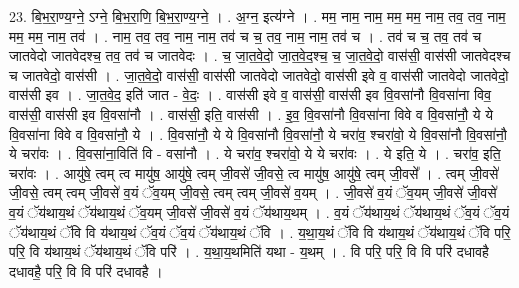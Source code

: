 \documentclass[17pt]{extarticle}
\begin{document}
23. बि॒भ॒रा॒ण्य॒ग्ने॒ ऽग्ने॒ बि॒भ॒रा॒णि॒ बि॒भ॒रा॒ण्य॒ग्ने॒ । . अ॒ग्न॒ इत्य॑ग्ने । . मम॒ नाम॒ नाम॒ मम॒ मम॒ नाम॒ तव॒ तव॒ नाम॒ मम॒ मम॒ नाम॒ तव॑ । . नाम॒ तव॒ तव॒ नाम॒ नाम॒ तव॑ च च॒ तव॒ नाम॒ नाम॒ तव॑ च । . तव॑ च च॒ तव॒ तव॑ च जातवेदो जातवेदश्च॒ तव॒ तव॑ च जातवेदः । . च॒ जा॒त॒वे॒दो॒ जा॒त॒वे॒द॒श्च॒ च॒ जा॒त॒वे॒दो॒ वास॑सी॒ वास॑सी जातवेदश्च च जातवेदो॒ वास॑सी । . जा॒त॒वे॒दो॒ वास॑सी॒ वास॑सी जातवेदो जातवेदो॒ वास॑सी इवे व॒ वास॑सी जातवेदो जातवेदो॒ वास॑सी इव । . जा॒त॒वे॒द॒ इति॑ जात - वे॒दः॒ । . वास॑सी इवे व॒ वास॑सी॒ वास॑सी इव वि॒वसा॑नौ वि॒वसा॑ना विव॒ वास॑सी॒ वास॑सी इव वि॒वसा॑नौ । . वास॑सी॒ इति॒ वास॑सी । . इ॒व॒ वि॒वसा॑नौ वि॒वसा॑ना विवे व वि॒वसा॑नौ॒ ये ये वि॒वसा॑ना विवे व वि॒वसा॑नौ॒ ये । . वि॒वसा॑नौ॒ ये ये वि॒वसा॑नौ वि॒वसा॑नौ॒ ये चरा॑व॒ श्चरा॑वो॒ ये वि॒वसा॑नौ वि॒वसा॑नौ॒ ये चरा॑वः । . वि॒वसा॑ना॒विति॑ वि - वसा॑नौ । . ये चरा॑व॒ श्चरा॑वो॒ ये ये चरा॑वः । . ये इति॒ ये । . चरा॑व॒ इति॒ चरा॑वः । . आयु॑षे॒ त्वम् त्व मायु॑ष॒ आयु॑षे॒ त्वम् जी॒वसे॑ जी॒वसे॒ त्व मायु॑ष॒ आयु॑षे॒ त्वम् जी॒वसे᳚ । . त्वम् जी॒वसे॑ जी॒वसे॒ त्वम् त्वम् जी॒वसे॑ व॒यं ॅव॒यम् जी॒वसे॒ त्वम् त्वम् जी॒वसे॑ व॒यम् । . जी॒वसे॑ व॒यं ॅव॒यम् जी॒वसे॑ जी॒वसे॑ व॒यं ॅय॑थाय॒थं ॅय॑थाय॒थं ॅव॒यम् जी॒वसे॑ जी॒वसे॑ व॒यं ॅय॑थाय॒थम् । . व॒यं ॅय॑थाय॒थं ॅय॑थाय॒थं ॅव॒यं ॅव॒यं ॅय॑थाय॒थं ॅवि वि य॑थाय॒थं ॅव॒यं ॅव॒यं ॅय॑थाय॒थं ॅवि । . य॒था॒य॒थं ॅवि वि य॑थाय॒थं ॅय॑थाय॒थं ॅवि परि॒ परि॒ वि य॑थाय॒थं ॅय॑थाय॒थं ॅवि परि॑ । . य॒था॒य॒थमिति॑ यथा - य॒थम् । . वि परि॒ परि॒ वि वि परि॑ दधावहै दधावहै॒ परि॒ वि वि परि॑ दधावहै । \newline
\end{document}
